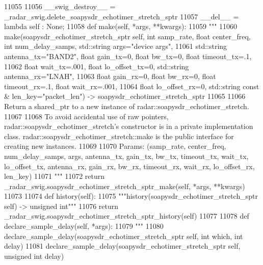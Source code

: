 \begin{DoxyCode}
{{{{{{{{{{{{{{{{{{{{{{{{{{{{{{{{{{{11055 
11056     \_\_swig\_destroy\_\_ = \_radar\_swig.delete\_soapysdr\_echotimer\_stretch\_sptr
11057     \_\_del\_\_ = \textcolor{keyword}{lambda} self : \textcolor{keywordtype}{None};
11058     \textcolor{keyword}{def }make(self, *args, **kwargs):
11059         \textcolor{stringliteral}{"""}
11060 \textcolor{stringliteral}{        make(soapysdr\_echotimer\_stretch\_sptr self, int samp\_rate, float center\_freq, int num\_delay\_samps,
       std::string args="device args", }
11061 \textcolor{stringliteral}{            std::string antenna\_tx="BAND2", float gain\_tx=0, float bw\_tx=0, float timeout\_tx=.1, }
11062 \textcolor{stringliteral}{            float wait\_tx=.001, float lo\_offset\_tx=0, std::string antenna\_rx="LNAH", }
11063 \textcolor{stringliteral}{            float gain\_rx=0, float bw\_rx=0, float timeout\_rx=.1, float wait\_rx=.001, }
11064 \textcolor{stringliteral}{            float lo\_offset\_rx=0, std::string const & len\_key="packet\_len") ->
       soapysdr\_echotimer\_stretch\_sptr}
11065 \textcolor{stringliteral}{}
11066 \textcolor{stringliteral}{        Return a shared\_ptr to a new instance of radar::soapysdr\_echotimer\_stretch.}
11067 \textcolor{stringliteral}{}
11068 \textcolor{stringliteral}{        To avoid accidental use of raw pointers, radar::soapysdr\_echotimer\_stretch's constructor is in a
       private implementation class. radar::soapysdr\_echotimer\_stretch::make is the public interface for creating new
       instances.}
11069 \textcolor{stringliteral}{}
11070 \textcolor{stringliteral}{        Params: (samp\_rate, center\_freq, num\_delay\_samps, args, antenna\_tx, gain\_tx, bw\_tx, timeout\_tx,
       wait\_tx, lo\_offset\_tx, antenna\_rx, gain\_rx, bw\_rx, timeout\_rx, wait\_rx, lo\_offset\_rx, len\_key)}
11071 \textcolor{stringliteral}{        """}
11072         \textcolor{keywordflow}{return} \_radar\_swig.soapysdr\_echotimer\_stretch\_sptr\_make(self, *args, **kwargs)
11073 
11074     \textcolor{keyword}{def }history(self):
11075         \textcolor{stringliteral}{"""history(soapysdr\_echotimer\_stretch\_sptr self) -> unsigned int"""}
11076         \textcolor{keywordflow}{return} \_radar\_swig.soapysdr\_echotimer\_stretch\_sptr\_history(self)
11077 
11078     \textcolor{keyword}{def }declare_sample_delay(self, *args):
11079         \textcolor{stringliteral}{"""}
11080 \textcolor{stringliteral}{        declare\_sample\_delay(soapysdr\_echotimer\_stretch\_sptr self, int which, int delay)}
11081 \textcolor{stringliteral}{        declare\_sample\_delay(soapysdr\_echotimer\_stretch\_sptr self, unsigned int delay)}
}}}}}}}}}}}}}}}}}}}}}}}}}}}}}}}}}}}
\end{DoxyCode}
